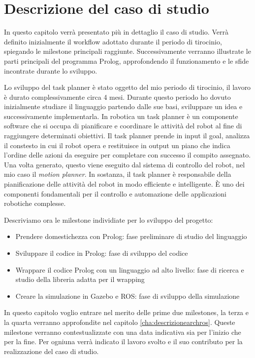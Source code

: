 \chapter{Descrizione del caso di studio}
\label{cha:descrizionecasostudio}
In questo capitolo verrà presentato più in dettaglio il caso di studio. Verrà definito inizialmente il workflow adottato durante il periodo di tirocinio, spiegando le milestone principali raggiunte.
Successivamente verranno illustrate le parti principali del programma Prolog, approfondendo il funzionamento e le sfide incontrate durante lo sviluppo.

Lo sviluppo del task planner è stato oggetto del mio periodo di tirocinio, il lavoro è durato complessivamente circa 4 mesi. Durante questo periodo ho dovuto inizialmente studiare il linguaggio partendo dalle sue basi, sviluppare un idea e successivamente implementarla.
In robotica un task planner è un componente software che si occupa di pianificare e coordinare le attività del robot al fine di raggiungere determinati obiettivi.
Il task planner prende in input il goal, analizza il constesto in cui il robot opera e restituisce in output un piano che indica l'ordine delle azioni da eseguire per completare con successo il compito assegnato.
Una volta generato, questo viene eseguito dal sistema di controllo del robot, nel mio caso il \textit{motion planner}. In sostanza, il task planner è responsabile della pianificazione delle attività del robot in modo efficiente e intelligente. È uno dei componenti fondamentali per il controllo e automazione delle applicazioni robotiche complesse.

Descriviamo ora le milestone individiate per lo sviluppo del progetto:
\begin{itemize}
    \item Prendere domestichezza con Prolog: fase preliminare di studio del linguaggio
    \item Sviluppare il codice in Prolog: fase di sviluppo del codice
    \item Wrappare il codice Prolog con un linguaggio ad alto livello: fase di ricerca e studio della libreria adatta per il wrapping
    \item Creare la simulazione in Gazebo e ROS: fase di sviluppo della simulazione
\end{itemize}
In questo capitolo voglio entrare nel merito delle prime due milestones, la terza e la quarta verranno approfondite nel capitolo \ref{cha:descrizionearchros}.
Queste milestone verranno contestualizzate con una data indicativa sia per l'inizio che per la fine. Per ogniuna verrà indicato il lavoro svolto e il suo contributo per la realizzazione del caso di studio.

